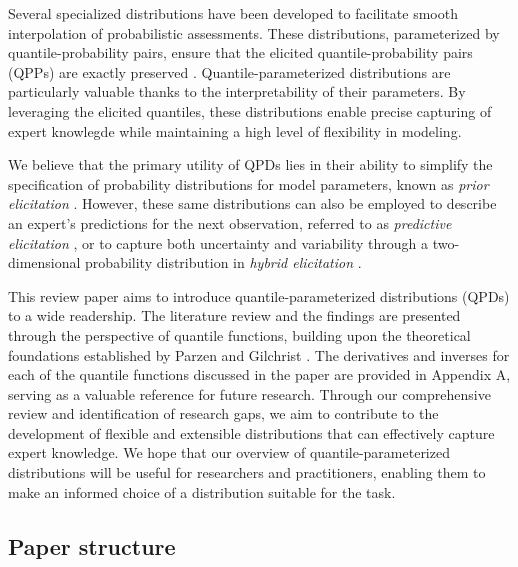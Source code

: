 \documentclass[
  fleqn,
  deca,
  blindrev
]{informs4}
\begin{document}
Several specialized distributions have been developed to facilitate
smooth interpolation of probabilistic assessments. These distributions,
parameterized by quantile-probability pairs, ensure that the elicited
quantile-probability pairs (QPPs) are exactly preserved
\citep{keelin2011QuantileParameterizedDistributions, powley2013QuantileFunctionMethods, keelin2016MetalogDistributions, hadlock2017QuantileparameterizedMethodsQuantifying, wilson2023ReconciliationExpertPriors}.
Quantile-parameterized distributions are particularly valuable thanks to
the interpretability of their parameters. By leveraging the elicited
quantiles, these distributions enable precise capturing of expert
knowlegde while maintaining a high level of flexibility in modeling.

We believe that the primary utility of QPDs lies in their ability to
simplify the specification of probability distributions for model
parameters, known as \emph{prior elicitation}
\citep{mikkola2021PriorKnowledgeElicitation}. However, these same
distributions can also be employed to describe an expert's predictions
for the next observation, referred to as \emph{predictive elicitation}
\citep{winkler1980PriorInformationPredictive, kadane1980PredictiveStructuralMethods, akbarov2009ProbabilityElicitationPredictive, hartmann2020FlexiblePriorElicitation},
or to capture both uncertainty and variability through a two-dimensional
probability distribution in \emph{hybrid elicitation}
\citep{perepolkin2021HybridElicitationIndirect}.

This review paper aims to introduce quantile-parameterized distributions
(QPDs) to a wide readership. The literature review and the findings are
presented through the perspective of quantile functions, building upon
the theoretical foundations established by Parzen
\citep{parzen1979NonparametricStatisticalData} and Gilchrist
\citep{gilchrist2000StatisticalModellingQuantile}. The derivatives and
inverses for each of the quantile functions discussed in the paper are
provided in Appendix A, serving as a valuable reference for future
research. Through our comprehensive review and identification of
research gaps, we aim to contribute to the development of flexible and
extensible distributions that can effectively capture expert knowledge.
We hope that our overview of quantile-parameterized distributions will
be useful for researchers and practitioners, enabling them to make an
informed choice of a distribution suitable for the task.

\subsection*{Paper structure}\label{paper-structure}
\end{document}
